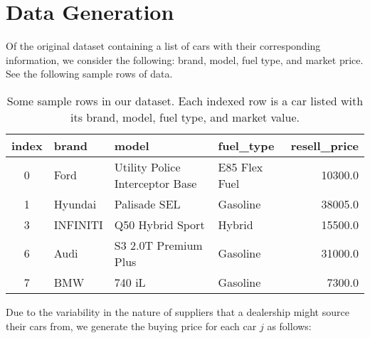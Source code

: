 \documentclass{article}
\begin{document}
\section{Data Generation}
Of the original dataset containing a list of cars with their corresponding information, we consider the following: brand, model, fuel type, and market price. See the following sample rows of data.
\begin{table}[h]
    \centering
    \begin{tabular}{c ll lr}
        \toprule
    \textbf{index} & \textbf{brand} & \textbf{model} & \textbf{fuel\_type} & \textbf{resell\_price} \\
        \midrule
        0 & Ford      & Utility Police Interceptor Base & E85 Flex Fuel & 10300.0 \\
        1 & Hyundai   & Palisade SEL                   & Gasoline      & 38005.0 \\
        3 & INFINITI  & Q50 Hybrid Sport               & Hybrid        & 15500.0 \\
        6 & Audi      & S3 2.0T Premium Plus           & Gasoline      & 31000.0 \\
        7 & BMW       & 740 iL                         & Gasoline      & 7300.0  \\
        \bottomrule
    \end{tabular}
    \caption{Some sample rows in our dataset. Each indexed row is a car listed with its brand, model, fuel type, and market value.}
    \label{tab:vehicle_data}
\end{table}
Due to the variability in the nature of suppliers that a dealership might source their cars from, we generate the buying price for each car $j$ as follows:
\end{document}
